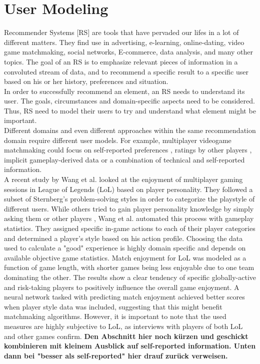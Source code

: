 \documentclass[nochapterpage,bigchapter,linedtoc,longdoc,colorback,accentcolor=tud3b,oneside]{tudreport}
\begin{document}
\section{User Modeling}
Recommender Systems [RS] are tools that have pervaded our lifes in a lot of different matters. They find use in advertising, e-learning, online-dating, video game matchmaking, social networks, E-commerce, data analysis, and many other topics. The goal of an RS is to emphasize relevant pieces of information in a convoluted stream of data, and to recommend a specific result to a specific user based on his or her history, preferences and situation. \cite{ricci2011introduction}\\
In order to successfully recommend an element, an RS needs to understand its user. The goals, circumstances and domain-specific aspects need to be considered. Thus, RS need to model their users to try and understand what element might be important.\\
Different domains and even different approaches within the same recommendation domain require different user models. For example, multiplayer videogame matchmaking could focus on self-reported preferences \cite{riegelsberger2007personality}, ratings by other players \cite{patrick2011system}, implicit gameplay-derived data \cite{suznjevic2015application, delalleau2012beyond} or a combination of technical and self-reported information. \cite{farnham2009method}\\
A recent study by Wang et al. \cite{wang2015thinking} looked at the enjoyment of multiplayer gaming sessions in League of Legends (LoL) based on player personality. They followed a subset of Sternberg's \cite{sternberg1999thinking} problem-solving styles in order to categorize the playstyle of different users. While others tried to gain player personality knowledge by simply asking them \cite{riegelsberger2007personality} or other players \cite{patrick2011system}, Wang et al. automated this process with gameplay statistics. They assigned specific in-game actions to each of their player categories and determined a player's style based on his action profile. Choosing the data used to calculate a "good" experience is highly domain specific and depends on available objective game statistics.\cite{delalleau2012beyond} Match enjoyment for LoL was modeled as a function of game length, with shorter games being less enjoyable due to one team dominating the other. The results show a clear tendency of specific globally-active and risk-taking players to positively influence the overall game enjoyment. A neural network tasked with predicting match enjoyment achieved better scores when player style data was included, suggesting that this might benefit matchmaking algorithms. However, it is important to note that the used measures are highly subjective to LoL, as interviews with players of both LoL and other games confirm. \textbf{Den Abschnitt hier noch kürzen und geschickt kombinieren mit kleinem Ausblick auf self-reported information. Unten dann bei "besser als self-reported" hier drauf zurück verweisen.}\\
\end{document}

